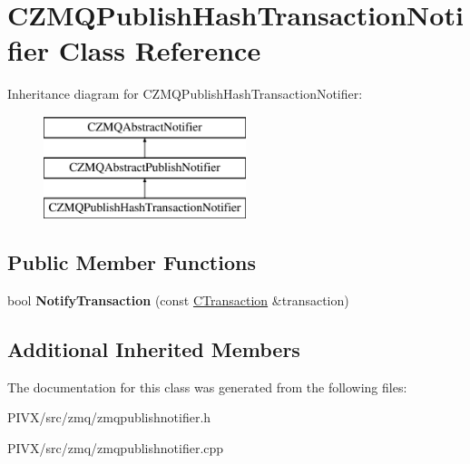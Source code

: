 \hypertarget{class_c_z_m_q_publish_hash_transaction_notifier}{}\section{C\+Z\+M\+Q\+Publish\+Hash\+Transaction\+Notifier Class Reference}
\label{class_c_z_m_q_publish_hash_transaction_notifier}
Inheritance diagram for C\+Z\+M\+Q\+Publish\+Hash\+Transaction\+Notifier\+:\begin{figure}[H]
\begin{center}
\leavevmode
\includegraphics[height=3.000000cm]{class_c_z_m_q_publish_hash_transaction_notifier}
\end{center}
\end{figure}
\subsection*{Public Member Functions}
\begin{DoxyCompactItemize}
\item 
\mbox{\label{class_c_z_m_q_publish_hash_transaction_notifier_a6c9eb947bfb2fd855f611b6519e76d14}} 
bool {\bfseries Notify\+Transaction} (const \mbox{\hyperlink{class_c_transaction}{C\+Transaction}} \&transaction)
\end{DoxyCompactItemize}
\subsection*{Additional Inherited Members}


The documentation for this class was generated from the following files\+:\begin{DoxyCompactItemize}
\item 
P\+I\+V\+X/src/zmq/zmqpublishnotifier.\+h\item 
P\+I\+V\+X/src/zmq/zmqpublishnotifier.\+cpp\end{DoxyCompactItemize}
